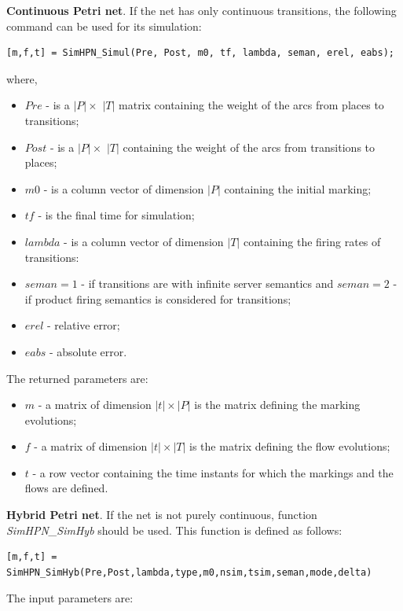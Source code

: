 \textbf{Continuous Petri net}. If the net has only continuous transitions, the following command can be used for its simulation:

\begin{verbatim}
[m,f,t] = SimHPN_Simul(Pre, Post, m0, tf, lambda, seman, erel, eabs);
\end{verbatim}
where, 
\begin{itemize}
\item $Pre$ - is a $|P| \times$ $|T|$ matrix containing the weight of the arcs from places to transitions;
\item $Post$ - is a $|P| \times$ $|T|$   containing the weight of the arcs from transitions to places;
\item $m0$ - is a column vector of dimension $|P|$ containing the initial marking;
\item $tf$ - is the final time for simulation;
\item $lambda$ - is a column vector of dimension $|T|$ containing the firing rates of transitions:
\item $seman = 1$ - if transitions are with infinite server semantics and $seman = 2$ - if product firing semantics is considered for transitions;
\item $erel$ - relative error;
\item $eabs$ - absolute error.
\end{itemize}

The returned parameters are:

\begin{itemize}
\item $m$ - a matrix of dimension $|t| \times |P|$ is the matrix defining the marking evolutions;
\item $f$ - a matrix of dimension $|t| \times |T|$ is the matrix defining the flow evolutions;
\item $t$ - a row vector containing the time instants for which the markings and the flows are defined.
\end{itemize}

\textbf{Hybrid Petri net}. If the net is not purely continuous, function \emph{SimHPN\_SimHyb} 
should be used. This function is defined as follows:

\begin{verbatim}
[m,f,t] = SimHPN_SimHyb(Pre,Post,lambda,type,m0,nsim,tsim,seman,mode,delta)
\end{verbatim}

The input parameters are:

